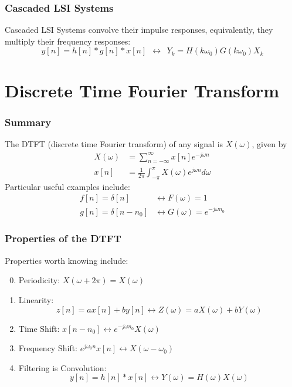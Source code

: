 \documentclass{beamer}
\begin{document}
\begin{frame}
  \frametitle{Cascaded LSI Systems}

  Cascaded LSI Systems convolve their impulse responses, equivalently, they
  multiply their frequency responses:
  \[
  y[n]=h[n]\ast g[n]\ast x[n]~~\leftrightarrow~~Y_k=H(k\omega_0)G(k\omega_0)X_k
  \]
\end{frame}




\section[DTFT]{Discrete Time Fourier Transform}
\setcounter{subsection}{1}


\begin{frame}
  \frametitle{Summary}

  The DTFT (discrete time Fourier transform) of any signal is
  $X(\omega)$, given by
  \begin{align*}
    X(\omega) &= \sum_{n=-\infty}^\infty x[n]e^{-j\omega n}\\
    x[n] &= \frac{1}{2\pi}\int_{-\pi}^\pi X(\omega)e^{j\omega n}d\omega
  \end{align*}
  Particular useful examples include:
  \begin{align*}
    f[n]=\delta[n] &\leftrightarrow F(\omega)=1\\
    g[n]=\delta[n-n_0] &\leftrightarrow G(\omega)=e^{-j\omega n_0}
  \end{align*}
\end{frame}

\begin{frame}
  \frametitle{Properties of the DTFT}

  Properties worth knowing  include:
  \begin{enumerate}
    \setcounter{enumi}{-1}
  \item Periodicity: $X(\omega+2\pi)=X(\omega)$
  \item Linearity:
    \[z[n]=ax[n]+by[n]\leftrightarrow Z(\omega)=aX(\omega)+bY(\omega)
    \]
  \item Time Shift: $x[n-n_0]\leftrightarrow e^{-j\omega n_0}X(\omega)$
  \item Frequency Shift: $e^{j\omega_0 n}x[n]\leftrightarrow X(\omega-\omega_0)$
  \item Filtering is Convolution:
    \[
    y[n]=h[n]\ast x[n]\leftrightarrow Y(\omega)=H(\omega)X(\omega)
    \]
  \end{enumerate}
\end{frame}
\end{document}
